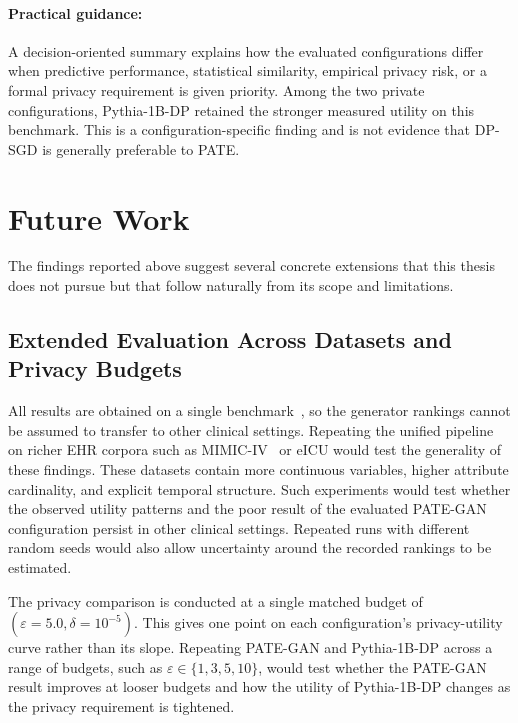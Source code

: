 \paragraph{Practical guidance:} A decision-oriented summary explains how the
evaluated configurations differ when predictive performance, statistical
similarity, empirical privacy risk, or a formal privacy requirement is given
priority. Among the two private configurations, Pythia-1B-DP retained the
stronger measured utility on this benchmark. This is a configuration-specific
finding and is not evidence that DP-SGD is generally preferable to PATE.

\section{Future Work}
\label{sec:conclusion:future}

The findings reported above suggest several concrete extensions that this
thesis does not pursue but that follow naturally from its scope and
limitations.

\subsection{Extended Evaluation Across Datasets and Privacy Budgets}
\label{sec:conclusion:future:robustness}
\label{sec:conclusion:future:cross-data}
\label{sec:conclusion:future:epsilon}

All results are obtained on a single benchmark~\cite{diabetes_db}, so the
generator rankings cannot be assumed to transfer to other clinical settings.
Repeating the unified pipeline on richer EHR corpora such as MIMIC-IV~\cite{mimic} 
or eICU would test the generality of these findings. These datasets contain 
more continuous variables, higher attribute cardinality, and explicit temporal 
structure. Such experiments would test whether the observed utility patterns
and the poor result of the evaluated PATE-GAN configuration persist in other
clinical settings. Repeated runs with different random seeds would also allow
uncertainty around the recorded rankings to be estimated.

The privacy comparison is conducted at a 
single matched budget of $(\varepsilon = 5.0, 
\delta = 10^{-5})$. This gives one point on each 
configuration's privacy-utility curve rather than its slope. Repeating PATE-GAN and
Pythia-1B-DP across a range of budgets, such as $\varepsilon \in \{1, 3, 5, 10\}$,
would test whether the PATE-GAN result improves at looser budgets and how the
utility of Pythia-1B-DP changes as the privacy requirement is tightened.

